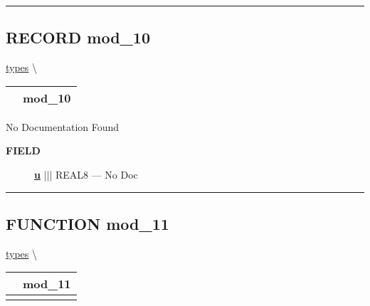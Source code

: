 \rule{\linewidth}{0.5pt}
\subsection*{\textsf{\colorbox{headtoc}{\color{white} RECORD}
mod\_10}}

\hypertarget{ecldoc:types.mod_10}{}
\hspace{0pt} \hyperlink{ecldoc:types}{types} \textbackslash 

{\renewcommand{\arraystretch}{1.5}
\begin{tabularx}{\textwidth}{|>{\raggedright\arraybackslash}l|X|}
\hline
\hspace{0pt}\mytexttt{\color{red} } & \textbf{mod\_10} \\
\hline
\end{tabularx}
}

\par





No Documentation Found







\par
\begin{description}
\item [\colorbox{tagtype}{\color{white} \textbf{\textsf{FIELD}}}] \textbf{\underline{u}} ||| REAL8 --- No Doc
\end{description}





\rule{\linewidth}{0.5pt}
\subsection*{\textsf{\colorbox{headtoc}{\color{white} FUNCTION}
mod\_11}}

\hypertarget{ecldoc:types.mod_11}{}
\hspace{0pt} \hyperlink{ecldoc:types}{types} \textbackslash 

{\renewcommand{\arraystretch}{1.5}
\begin{tabularx}{\textwidth}{|>{\raggedright\arraybackslash}l|X|}
\hline
\hspace{0pt}\mytexttt{\color{red} } & \textbf{mod\_11} \\
\hline
\multicolumn{2}{|>{\raggedright\arraybackslash}X|}{\hspace{0pt}\mytexttt{\color{param} (DATASET(mod\_10) y)}} \\
\hline
\end{tabularx}
}

